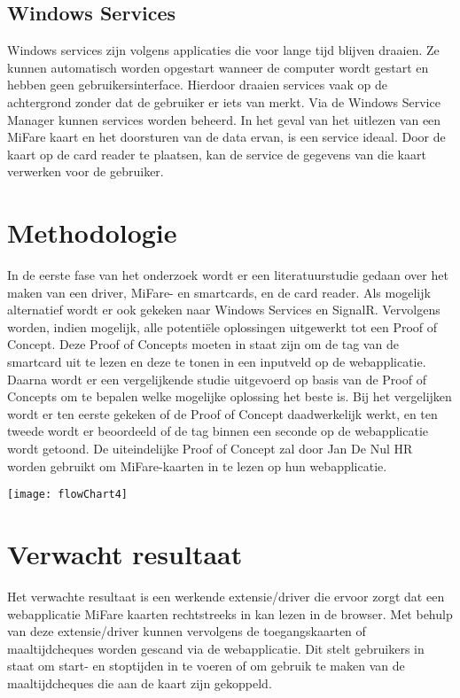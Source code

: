 \subsection{Windows Services}
Windows services zijn volgens \textcite{MicrosoftWS} applicaties die voor lange tijd blijven draaien. Ze kunnen automatisch worden opgestart wanneer de computer wordt gestart en hebben geen gebruikersinterface. Hierdoor draaien services vaak op de achtergrond zonder dat de gebruiker er iets van merkt. Via de Windows Service Manager kunnen services worden beheerd. In het geval van het uitlezen van een MiFare kaart en het doorsturen van de data ervan, is een service ideaal. Door de kaart op de card reader te plaatsen, kan de service de gegevens van die kaart verwerken voor de gebruiker.

\section{Methodologie}%
\label{sec:methodologie}
In de eerste fase van het onderzoek wordt er een literatuurstudie gedaan over het maken van een driver, MiFare- en smartcards, en de card reader. Als mogelijk alternatief wordt er ook gekeken naar Windows Services en SignalR. Vervolgens worden, indien mogelijk, alle potentiële oplossingen uitgewerkt tot een Proof of Concept. Deze Proof of Concepts moeten in staat zijn om de tag van de smartcard uit te lezen en deze te tonen in een inputveld op de webapplicatie.
Daarna wordt er een vergelijkende studie uitgevoerd op basis van de Proof of Concepts om te bepalen welke mogelijke oplossing het beste is. Bij het vergelijken wordt er ten eerste gekeken of de Proof of Concept daadwerkelijk werkt, en ten tweede wordt er beoordeeld of de tag binnen een seconde op de webapplicatie wordt getoond.
De uiteindelijke Proof of Concept zal door Jan De Nul HR worden gebruikt om MiFare-kaarten in te lezen op hun webapplicatie.

\begin{center}
    \texttt{[image: flowChart4]}
\end{center}

\section{Verwacht resultaat}%
\label{sec:verwachte_resultaten}
Het verwachte resultaat is een werkende extensie/driver die ervoor zorgt dat een webapplicatie MiFare kaarten rechtstreeks in kan lezen in de browser. Met behulp van deze extensie/driver kunnen vervolgens de toegangskaarten of maaltijdcheques worden gescand via de webapplicatie. Dit stelt gebruikers in staat om start- en stoptijden in te voeren of om gebruik te maken van de maaltijdcheques die aan de kaart zijn gekoppeld.

